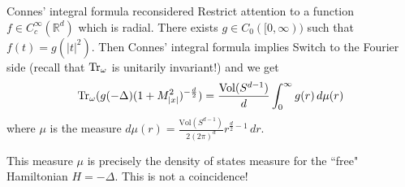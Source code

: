 \documentclass{beamer}
\numberwithin{equation}{section}
\theoremstyle{plain}
\theoremstyle{plain}
\theoremstyle{definition}
\theoremstyle{plain}
\theoremstyle{plain}
\theoremstyle{definition}
\newcommand{\tr}{{\rm Tr}}
\newcommand{\Vol}{\mathrm{Vol}}
\newcommand{\Rl}{\mathbb{R}}
\begin{document}
% 

\begin{frame}{Connes' integral formula reconsidered}
    Restrict attention to a function $f \in C^\infty_c(\Rl^d)$ which is radial. There exists $g \in C_0([0,\infty))$ such that $f(t) = g(|t|^2)$. Then Connes' integral formula implies
    Switch to the Fourier side (recall that $\tr_{\omega}$ is unitarily invariant!) and we get
    $$
        \tr_{\omega}(g(-\Delta)(1+M_{|x|}^2)^{-\frac{d}{2}}) = \frac{\Vol(S^{d-1})}{d}\int_0^{\infty} g(r) \,d\mu(r)
    $$
    where $\mu$ is the measure $d\mu(r) = \frac{\Vol(S^{d-1})}{2(2\pi)^d}r^{\frac{d}{2}-1}\,dr.$
     
    This measure $\mu$ is precisely the density of states measure for the ``free" Hamiltonian $H = -\Delta$. This is not a coincidence!
\end{frame}
\end{document}
